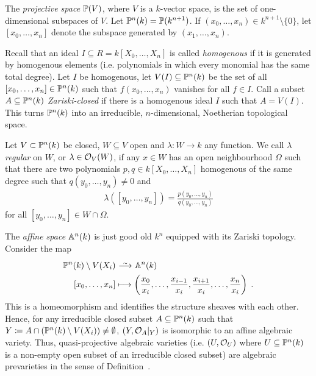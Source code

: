 \documentclass[a4paper,parskip=half,numbers=enddot, DIV=12]{scrreprt}
\begin{document}
	\begin{example}
	    The \emph{projective space} $\mathbb{P}(V)$, where $V$ is a $k$-vector space, is the set of one-dimensional subspaces of $V$. Let $\mathbb{P}^n(k) = \mathbb{P}(k^{n+1})$. If $(x_0,\ldots,x_n)\in k^{n+1}\setminus\{0\}$, let $[x_0,\ldots,x_n]$ denote the subspace generated by $(x_1,\ldots, x_n)$.
	     
	     Recall that an ideal $I\subseteq R=k[X_0,\ldots,X_n]$ is called \emph{homogenous} if it is generated by homogenous elements (i.e. polynomials in which every monomial has the same total degree). Let $I$ be homogenous, let $V(I)\subseteq \mathbb{P}^n(k)$ be the set of all $[x_0, \ldots, x_n]\in\mathbb{P}^n(k)$ such that $f(x_0,\ldots, x_n)$ vanishes for all $f\in I$. Call a subset $A\subseteq\mathbb{P}^n(k)$ \emph{Zariski-closed} if there is a homogenous ideal $I$ such that $A= V(I)$. This turns $\mathbb{P}^n(k)$ into an irreducible, $n$-dimensional, Noetherian topological space.
	     
	     Let $V\subset \mathbb{P}^n(k)$ be closed, $W\subseteq V$ open and $\lambda\colon W\to k$ any function. We call $\lambda$ \emph{regular} on $W$, or $\lambda \in \mathcal{O}_V(W)$, if any $x\in W$ has an open neighbourhood $\Omega$ such that there are two polynomials $p,q\in k[X_0,\ldots,X_n]$ homogenous of the same degree such that $q(y_0,\ldots,y_n) \neq 0$ and 
	     \begin{align*}
	     	\lambda([y_0,\ldots,y_n]) = \frac{p(y_0,\ldots,y_n)}{q(y_0,\ldots,y_n)}
	     \end{align*}
	     for all $[y_0,\ldots,y_n]\in W\cap \Omega$.
	     
	     The \emph{affine space} $\mathbb{A}^n(k)$ is just good old $k^n$ equipped with its Zariski topology. Consider the map
	     \begin{align*}
	        \IP^n(k)\setminus V(X_i) &\isomorphism \IA^n(k)\\
	        [x_0,\ldots, x_n]&\longmapsto \left(\frac{x_0}{x_i}, \ldots, 
	        \frac{x_{i-1}}{x_i},\frac{x_{i+1}}{x_i},\ldots,\frac{x_n}{x_i}\right)\;.
	    \end{align*}
	    This is a homeomorphism and identifies the structure sheaves with each other. Hence, for any irreducible closed subset $A\subseteq \mathbb{P}^n(k)$ such that $Y\coloneqq A\cap(\mathbb{P}^n(k)\setminus V(X_i)) \neq \emptyset$, $(Y, \mathcal{O}_A|_Y) $ is isomorphic to an affine algebraic variety. Thus, quasi-projective algebraic varieties (i.e. $(U,\mathcal{O}_U)$ where $U\subseteq \mathbb{P}^n(k)$ is a non-empty open subset of an irreducible closed subset) are algebraic prevarieties in the sense of Definition~.
\end{example}
\end{document}
